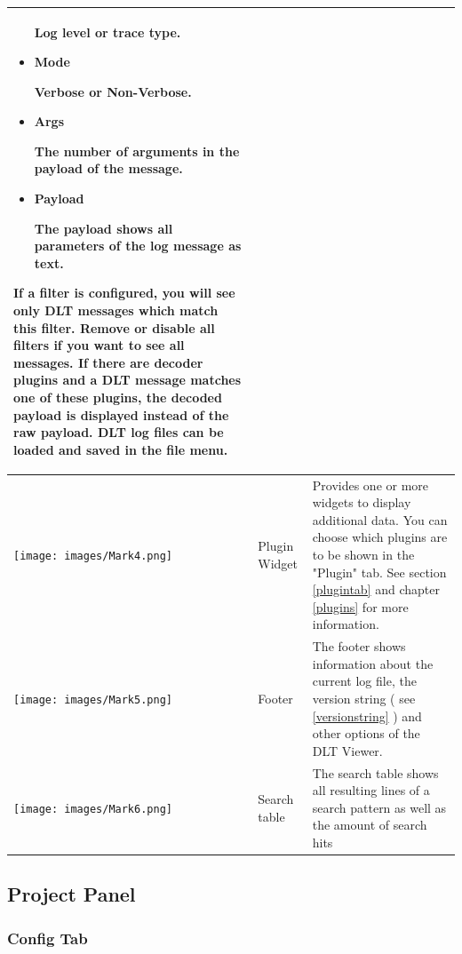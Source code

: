 \documentclass[a4paper,11pt]{article}
\begin{document}
\begin{longtable}{| l | m{3cm}  | m{11cm} |}
\begin{itemize}
    Log level or trace type.
   \item \begin{bf}Mode\end{bf}
    Verbose or Non-Verbose.
   \item \begin{bf}Args\end{bf}
    The number of arguments in the payload of the message.
   \item \begin{bf}Payload\end{bf}
    The payload shows all parameters of the log message as text.
  \end{itemize}
If a filter is configured, you will see only DLT messages which match
this filter. Remove or disable all filters if you want to see all messages.
If there are decoder plugins and a DLT message matches one of these plugins, the decoded
payload is displayed instead of the raw payload.
DLT log files can be loaded and saved in the file menu.
 \\
   \hline
   \texttt{[image: images/Mark4.png]}
   & Plugin Widget
   & Provides one or more widgets to display additional data. You can choose which plugins are to be shown in the "Plugin" tab.
   See section \autoref{plugintab} and chapter \autoref{plugins} for more information.   \\
   \hline
   \texttt{[image: images/Mark5.png]}
   & Footer
   & \label{footer}The footer shows information about the current log file,
     the version string ( see \autoref{versionstring} ) and other options of the DLT Viewer. \\
   \hline
   \texttt{[image: images/Mark6.png]}
    & Search table
    & \label{searchtable}The search table shows all resulting lines of a search pattern as well as the amount of search hits \\
   \hline

\end{longtable}


\pagebreak

\subsection{Project Panel}

\subsubsection{Config Tab}
\end{document}
